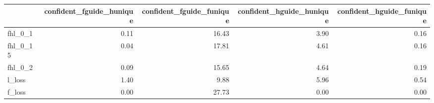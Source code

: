 \begin{tabular}{lrrrr}
\toprule
 & confident_fguide_hunique & confident_fguide_funique & confident_hguide_hunique & confident_hguide_funique \\
\midrule
fhl_0_1 & 0.11 & 16.43 & 3.90 & 0.16 \\
fhl_0_15 & 0.04 & 17.81 & 4.61 & 0.16 \\
fhl_0_2 & 0.09 & 15.65 & 4.64 & 0.19 \\
l_loss & 1.40 & 9.88 & 5.96 & 0.54 \\
f_loss & 0.00 & 27.73 & 0.00 & 0.00 \\
\bottomrule
\end{tabular}
